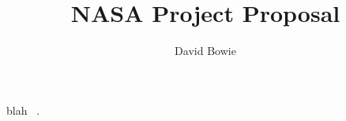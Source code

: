 \documentclass[12pt,twoside]{article}
\title{\textbf{\doctitle}\\
NASA Project Proposal}
\author{David Bowie}
\begin{document}
\thispagestyle{empty}

\maketitle

blah ~\cite{Heroes,Changes}.


\end{document}
